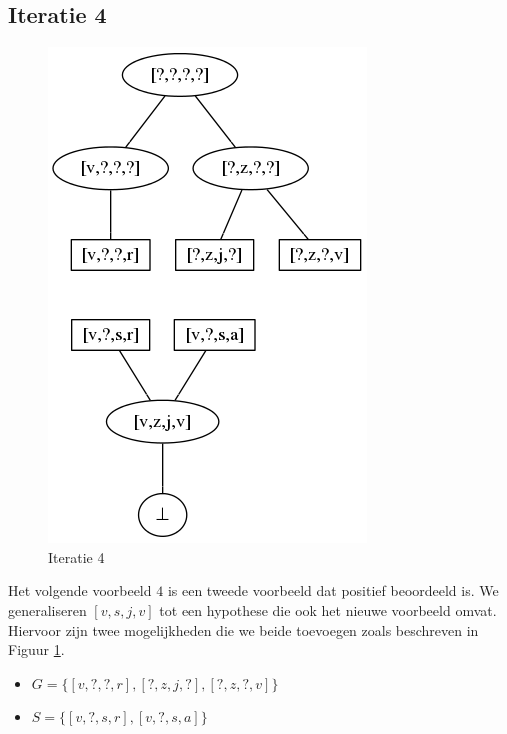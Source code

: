 \documentclass[alternative-exam.tex]{subfiles}
\begin{document}
\subsection{Iteratie 4}
\begin{figure}
[H]
\centering
\caption{Iteratie 4}
\label{iter_4}
\includegraphics[scale=0.5]{resources/graphs/iteration_4.png}
\end{figure}
Het volgende voorbeeld $4$ is een tweede voorbeeld dat positief beoordeeld is. We generaliseren $[v,s,j,v]$ tot een hypothese die ook het nieuwe voorbeeld omvat. Hiervoor zijn twee mogelijkheden die we beide toevoegen zoals beschreven in Figuur \ref{iter_4}.
\begin{itemize}
\item $G = \{[v,?,?,r],[?,z,j,?],[?,z,?,v]\}$
\item $S = \{[v,?,s,r],[v,?,s,a]\}$
\end{itemize}
\end{document}

